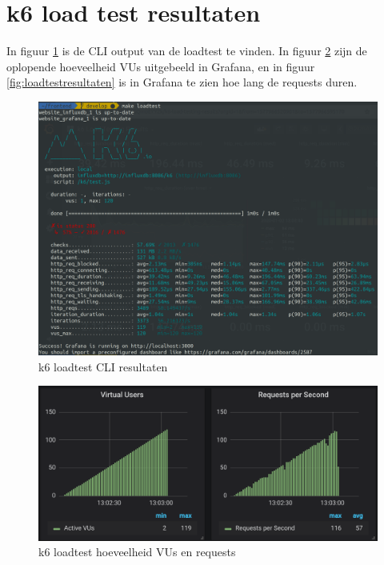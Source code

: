 \section{k6 load test resultaten}

\label{bijlageloadtest}

In figuur \ref{fig:loadtestcli} is de CLI output van de loadtest te vinden. In figuur \ref{fig:loadtestvus} zijn de oplopende hoeveelheid VUs uitgebeeld in Grafana, en in figuur \ref{fig:loadtestresultaten} is in Grafana te zien hoe lang de requests duren.
\begin{figure}[H]
	\centering
	\includegraphics[width=13cm]{Figures/loadtest}
	\decoRule
	\caption[k6 loadtest CLI resultaten]{k6 loadtest CLI resultaten}
	\label{fig:loadtestcli}
\end{figure}

\begin{figure}[H]
	\centering
	\includegraphics[width=13cm]{Figures/loadtestusers}
	\decoRule
	\caption[k6 loadtest hoeveelheid VUs en requests]{k6 loadtest hoeveelheid VUs en requests}
	\label{fig:loadtestvus}
\end{figure}

